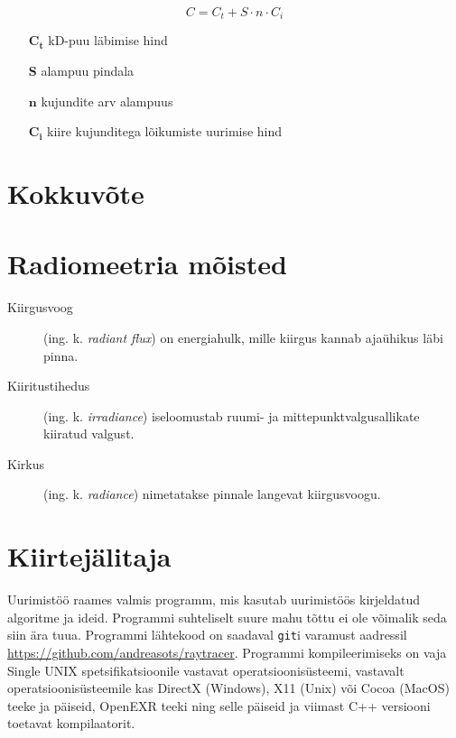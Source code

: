 \documentclass[a4paper,12pt]{report}
\begin{document}
\begin{equation} \label{eq:SAH}
C = C_t + S \cdot n \cdot C_i
\end{equation}
\begin{itemize}
\item[\(\mathbf{C_t}\)] kD-puu läbimise hind
\item[\(\mathbf{S}\)] alampuu pindala
\item[\(\mathbf{n}\)] kujundite arv alampuus
\item[\(\mathbf{C_i}\)] kiire kujunditega lõikumiste uurimise hind
\end{itemize}



\chapter*{Kokkuvõte}

\renewcommand\bibname{Kasutatud materjalid}



\appendix
\chapter{Radiomeetria mõisted}
\begin{description}
\item[Kiirgusvoog] (ing. k. \textit{radiant flux}) on energiahulk, mille kiirgus kannab ajaühikus läbi pinna.
\item[Kiiritustihedus] (ing. k. \textit{irradiance}) iseloomustab ruumi- ja mittepunktvalgusallikate kiiratud valgust.
\item[Kirkus] (ing. k. \textit{radiance}) nimetatakse pinnale langevat kiirgusvoogu.
\end{description}

\chapter{Kiirtejälitaja}
Uurimistöö raames valmis programm, mis kasutab uurimistöös kirjeldatud
algoritme ja ideid. Programmi suhteliselt suure mahu tõttu ei ole võimalik
seda siin ära tuua. Programmi lähtekood on saadaval \texttt{git}i varamust
aadressil \url{https://github.com/andreasots/raytracer}. Programmi kompileerimiseks
on vaja Single UNIX spetsifikatsioonile vastavat operatsioonisüsteemi,
vastavalt operatsioonisüsteemile kas DirectX (Windows), X11 (Unix) või
Cocoa (MacOS) teeke ja päiseid, OpenEXR teeki ning selle päiseid ja
viimast C++ versiooni toetavat kompilaatorit.
\end{document}
